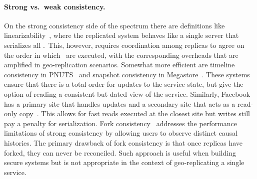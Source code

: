 \paragraph{ Strong vs.\ weak consistency.}
On the strong consistency side of the spectrum there are definitions
like linearizability~\cite{Herlihy1990Linearizability}, where the
rep\-li\-cated system behaves like a single server that
serializes all \operations.\ This, however, requires coordination among rep\-li\-cas
to agree on the order in which \operations\ are executed, with the
corresponding overheads that are amplified in
geo-rep\-li\-ca\-tion scenarios. Somewhat more efficient are
timeline consistency in PNUTS~\cite{Cooper2008PNUTS} and
snapshot consistency in Megastore~\cite{Baker2011Megastore}. These
systems ensure that there is a
total order for updates to the service state, but give the option
of reading a
consistent but dated view of the service. %
Similarly, Facebook has a primary site that handles updates
and a secondary site that acts as a read-only copy~\cite{Li2012Practical}.
This allows for fast reads executed at the closest site but writes still pay a penalty for serialization.  
Fork consistency~\cite{Krohn2004Sundr, Mazieres2002Fork} addresses
the performance limitations of strong consistency by allowing users to
observe distinct causal histories.  The primary drawback of fork
consistency is that once replicas have forked, they can never be
reconciled.  Such approach is useful when building secure systems
but is not appropriate in the context of geo-replicating a single
service.

